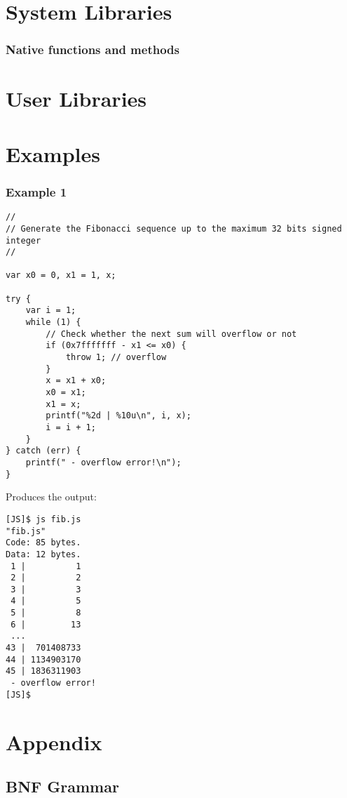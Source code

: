 \section {System Libraries}

\subsubsection{Native functions and methods}

\section {User Libraries}

\section {Examples}

\subsubsection{Example 1}

\begin{lstlisting}[language=uJS]
//
// Generate the Fibonacci sequence up to the maximum 32 bits signed integer
//

var x0 = 0, x1 = 1, x;

try {
    var i = 1;
    while (1) {
        // Check whether the next sum will overflow or not
        if (0x7fffffff - x1 <= x0) {
            throw 1; // overflow
        }
        x = x1 + x0;
        x0 = x1;
        x1 = x;
        printf("%2d | %10u\n", i, x);
        i = i + 1;
    }
} catch (err) {
    printf(" - overflow error!\n");
}
\end{lstlisting}
Produces the output:

\begin{lstlisting}[language=Console]
[JS]$ js fib.js
"fib.js"
Code: 85 bytes.
Data: 12 bytes.
 1 |          1
 2 |          2
 3 |          3
 4 |          5
 5 |          8
 6 |         13
 ...
43 |  701408733
44 | 1134903170
45 | 1836311903
 - overflow error!
[JS]$
\end{lstlisting}

\section{Appendix}

\subsection{BNF Grammar}

